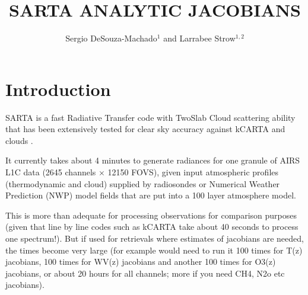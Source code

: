 \documentclass[11pt]{article}
\newcommand{\kc}{\textsf{kCARTA}\xspace}
\newcommand{\sa}{\textsf{SARTA}\xspace}
\begin{document}


\renewcommand\thepage{}
\newpage
\renewcommand\thepage{\arabic{page}}


\setcounter{page}{1}


\title{SARTA ANALYTIC JACOBIANS}
\author{Sergio DeSouza-Machado$^{1}$ and Larrabee Strow$^{1,2}$}

\date{}

\maketitle

\vspace{-0.375in}

\section{Introduction}

\sa is a fast Radiative Transfer code with TwoSlab Cloud scattering
ability \citep{mac:17*2} that has been extensively tested for clear
sky accuracy against \eg \kc \citep{mac:19} and clouds
\citep{mac:17*2,aum:18,aum:23}.

It currently takes about 4 minutes to generate radiances for one
granule of AIRS L1C data (2645 channels $\times$ 12150 FOVS), given
input atmospheric profiles (thermodynamic and cloud) supplied by \eg
radiosondes or Numerical Weather Prediction (NWP) model fields that are put into a 
100 layer atmosphere model.

This is more than adequate for processing observations for comparison
purposes (given that line by line codes such as \kc take about 40
seconds to process one spectrum!). But if used for retrievals where
estimates of jacobians are needed, the times become very large (for
example would need to run it 100 times for T(z) jacobians, 100 times
for WV(z) jacobians and another 100 times for O3(z) jacobians, or
about 20 hours for all channels; more if you need \eg CH4, N2o etc
jacobians).
\end{document}
